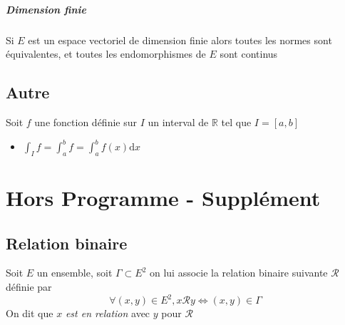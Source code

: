 \documentclass[11pt,colorlinks]{book}
\theoremstyle{mytheoremstyle}
\theoremstyle{mytheoremstyle}
\theoremstyle{mytheoremstyle}
\theoremstyle{mytheoremstyle}
\theoremstyle{mytheoremstyle}
\theoremstyle{mytheoremstyle}
\theoremstyle{mytheoremstyle}
\theoremstyle{mytheoremstyle}
\theoremstyle{myproblemstyle}
\def\mbb#1{\mathbb{#1}}
\def\bR{\mbb{R}}
\def\ev{espace vectoriel }
\begin{document}
\paragraph{Dimension finie}
\begin{definition}
  Si $E$ est un \ev de dimension finie alors toutes les normes sont équivalentes, et toutes les endomorphismes de $E$ sont continus
\end{definition}
\section{Autre}
\begin{rmq}
  Soit $f$ une fonction définie sur $I$ un interval de $\bR$ tel que $I = [a,b]$
  \begin{itemize}
    \item $\int_I f = \int_a^b f = \int_a^b f(x) \text{d}x$
  \end{itemize}
\end{rmq}
\chapter{Hors Programme - Supplément}
\section{Relation binaire}
\begin{definition}
  Soit $E$ un ensemble, soit $\Gamma \subset E^2$ on lui associe la relation binaire suivante $\mathcal{R}$ définie par 
  \begin{equation*}
    \forall (x,y) \in E^2, x\mathcal{R}y \Leftrightarrow (x,y) \in \Gamma
  \end{equation*}
  On dit que $x$ \textit{est en relation} avec $y$ pour $\mathcal{R}$
\end{definition}
\end{document}
